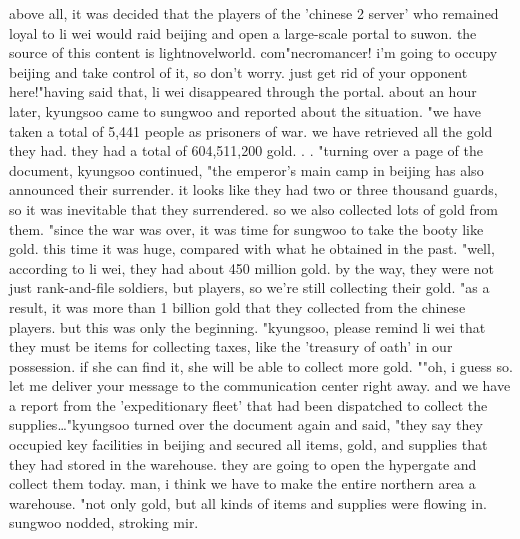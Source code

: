 above all, it was decided that the players of the 'chinese 2 server' who remained loyal to li wei would raid beijing and open a large-scale portal to suwon.
the source of this content is lightnov‌elworld.
c­om"necromancer! i'm going to occupy beijing and take control of it, so don't worry.
 just get rid of your opponent here!"having said that, li wei disappeared through the portal.
about an hour later, kyungsoo came to sungwoo and reported about the situation.
 "we have taken a total of 5,441 people as prisoners of war.
 we have retrieved all the gold they had.
 they had a total of 604,511,200 gold.
.
.
"turning over a page of the document, kyungsoo continued, "the emperor's main camp in beijing has also announced their surrender.
 it looks like they had two or three thousand guards, so it was inevitable that they surrendered.
 so we also collected lots of gold from them.
"since the war was over, it was time for sungwoo to take the booty like gold.
 this time it was huge, compared with what he obtained in the past.
"well, according to li wei, they had about 450 million gold.
 by the way, they were not just rank-and-file soldiers, but players, so we're still collecting their gold.
"as a result, it was more than 1 billion gold that they collected from the chinese players.
 but this was only the beginning.
 "kyungsoo, please remind li wei that they must be items for collecting taxes, like the 'treasury of oath' in our possession.
 if she can find it, she will be able to collect more gold.
""oh, i guess so.
 let me deliver your message to the communication center right away.
 and we have a report from the 'expeditionary fleet' that had been dispatched to collect the supplies…"kyungsoo turned over the document again and said, "they say they occupied key facilities in beijing and secured all items, gold, and supplies that they had stored in the warehouse.
 they are going to open the hypergate and collect them today.
 man, i think we have to make the entire northern area a warehouse.
"not only gold, but all kinds of items and supplies were flowing in.
sungwoo nodded, stroking mir.

